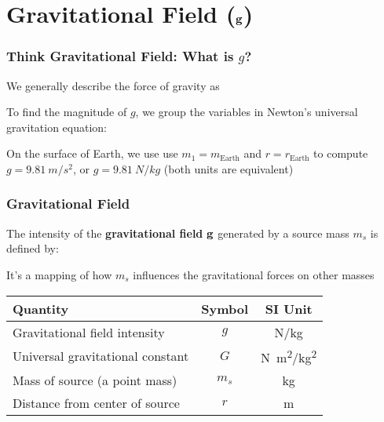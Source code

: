 \documentclass[12pt,compress,aspectratio=169]{beamer}
\newcommand{\mb}[1]{\ensuremath\mathbf{#1}}
\begin{document}
\section[$\mb{g}$]{Gravitational Field ($\mb{g}$)}


\begin{frame}
  \frametitle{Think Gravitational Field: What is $g$?}

  We generally describe the force of gravity as
  
  \vspace{-.25in}{\Large
    \begin{displaymath}
      \mb{F}_g=m\mb{g}
    \end{displaymath}
  }

  \vspace{-.2in}
  To find the magnitude of $g$, we group the variables in Newton's
  universal gravitation equation:
    

  \vspace{-.1in}
  On the surface of Earth, we use use $m_1=m_\mathrm{Earth}$ and
  $r=r_\mathrm{Earth}$ to compute $g=\SI{9.81}{m/s^2}$, or $g=\SI{9.81}{N/kg}$
  (both units are  equivalent)
\end{frame}

\begin{frame}
  \frametitle{Gravitational Field}
  The intensity of the \textbf{gravitational field} $\mb{g}$ generated by
  a source mass $m_s$ is defined by:

  
  It's a mapping of how $m_s$ influences the gravitational forces on other
  masses

  \begin{center}
    \begin{tabular}{l|c|c}
      \rowcolor{pink}
      \textbf{Quantity} & \textbf{Symbol} & \textbf{SI Unit} \\ \hline
      Gravitational field intensity    & $g$   & \si{N/kg}\\
      Universal gravitational constant & $G$   & \si{N.m^2/kg^2} \\
      Mass of source (a point mass)    & $m_s$ & \si{kg} \\
      Distance from center of source   & $r$   & \si{m} \\
    \end{tabular}
  \end{center}
\end{frame}
\end{document}
